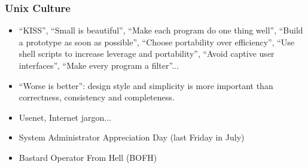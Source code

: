 \documentclass{beamer}
\begin{document}

\begin{frame}
\frametitle{Unix Culture}

\begin{itemize}
\item ``KISS'', ``Small is beautiful'', ``Make each program do one thing well'', ``Build a prototype as soon as possible'', ``Choose portability over efficiency'', ``Use shell scripts to increase leverage and portability'', ``Avoid captive user interfaces'', ``Make every program a filter''...
\item ``Worse is better'': design style and simplicity is more important than correctness, consistency and completeness.
\item Usenet, Internet jargon... 
\item System Administrator Appreciation Day (last Friday in July)
\item Bastard Operator From Hell (BOFH)
\end{itemize}
\end{frame}
\end{document}
